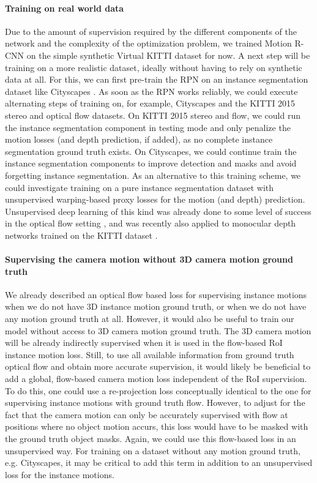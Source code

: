 \paragraph{Training on real world data}
Due to the amount of supervision required by the different components of the network
and the complexity of the optimization problem,
we trained Motion R-CNN on the simple synthetic Virtual KITTI dataset for now.
A next step will be training on a more realistic dataset,
ideally without having to rely on synthetic data at all.
For this, we can first pre-train the RPN on an instance segmentation dataset like
Cityscapes \cite{Cityscapes}. As soon as the RPN works reliably, we could execute alternating
steps of training on, for example, Cityscapes and the KITTI 2015 stereo and optical flow datasets.
On KITTI 2015 stereo and flow, we could run the instance segmentation component in testing mode and only penalize
the motion losses (and depth prediction, if added), as no complete instance segmentation ground truth exists.
On Cityscapes, we could continue train the instance segmentation components to
improve detection and masks and avoid forgetting instance segmentation.
As an alternative to this training scheme, we could investigate training on a pure
instance segmentation dataset with unsupervised warping-based proxy losses for the motion (and depth)
prediction. Unsupervised deep learning of this kind was already done to some level of success in the optical flow
setting \cite{UnsupFlownet, UnFlow},
and was recently also applied to monocular depth networks trained on the KITTI dataset \cite{UnsupDepth}.

\paragraph{Supervising the camera motion without 3D camera motion ground truth}
We already described an optical flow based loss for supervising instance motions
when we do not have 3D instance motion ground truth, or when we do not have
any motion ground truth at all.
However, it would also be useful to train our model without access to 3D camera
motion ground truth.
The 3D camera motion will be already indirectly supervised when it is used in the flow-based
RoI instance motion loss. Still, to use all available information from
ground truth optical flow and obtain more accurate supervision,
it would likely be beneficial to add a global, flow-based camera motion loss
independent of the RoI supervision.
To do this, one could use a re-projection loss conceptually identical to the one
for supervising instance motions with ground truth flow. However, to adjust for the
fact that the camera motion can only be accurately supervised with flow at positions where
no object motion accurs, this loss would have to be masked with the ground truth
object masks. Again, we could use this flow-based loss in an unsupervised way.
For training on a dataset without any motion ground truth, e.g.
Cityscapes, it may be critical to add this term in addition to an unsupervised
loss for the instance motions.


